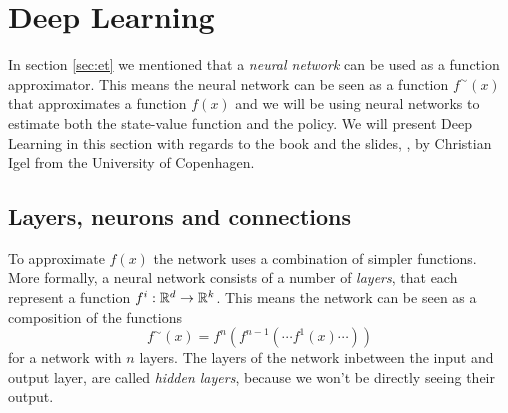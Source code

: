 \documentclass[11pt]{article}
\begin{document}
\maketitle

\section{Deep Learning}\label{sec:deep_learning}

In section \ref{sec:et} we mentioned that
a \textit{neural network} can be used as a function approximator.
This means the neural network can be seen as a function $f^\sim(x)$ that approximates a
function $f(x)$ and we will be using neural networks to estimate
both the state-value function and the policy.
We will present Deep Learning in this section with regards to the book \cite{DeepLearningBook} and the slides, \cite{IgelConv}, by Christian Igel
from the University of Copenhagen.

\subsection{Layers, neurons and connections}\label{sec:lnc}

To approximate $f(x)$ the network uses a combination of simpler functions.
More formally, a neural network consists of a number of \textit{layers},
that each represent a function $f^i : \mathbb{R}^{d} \to \mathbb{R}^k$.
This means the network can be seen as a composition of the functions
\begin{equation}\label{eq:layers}
    f^\sim(x) = f^n(f^{n-1}( \cdots f^1(x) \cdots))
\end{equation}
for a network with $n$ layers.
The layers of the network inbetween the input and output layer, are called
\textit{hidden layers}, because we won't be directly seeing their output.
\end{document}

